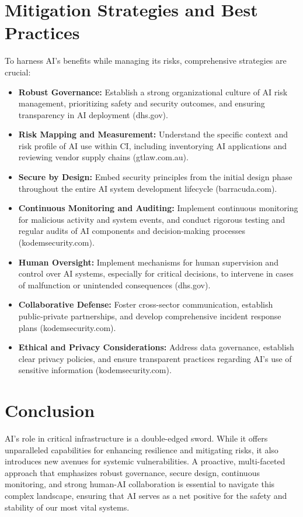 \section{Mitigation Strategies and Best Practices}
To harness AI's benefits while managing its risks, comprehensive strategies are crucial:
\begin{itemize}
    \item \textbf{Robust Governance:} Establish a strong organizational culture of AI risk management, prioritizing safety and security outcomes, and ensuring transparency in AI deployment (dhs.gov).
    \item \textbf{Risk Mapping and Measurement:} Understand the specific context and risk profile of AI use within CI, including inventorying AI applications and reviewing vendor supply chains (gtlaw.com.au).
    \item \textbf{Secure by Design:} Embed security principles from the initial design phase throughout the entire AI system development lifecycle (barracuda.com).
    \item \textbf{Continuous Monitoring and Auditing:} Implement continuous monitoring for malicious activity and system events, and conduct rigorous testing and regular audits of AI components and decision-making processes (kodemsecurity.com).
    \item \textbf{Human Oversight:} Implement mechanisms for human supervision and control over AI systems, especially for critical decisions, to intervene in cases of malfunction or unintended consequences (dhs.gov).
    \item \textbf{Collaborative Defense:} Foster cross-sector communication, establish public-private partnerships, and develop comprehensive incident response plans (kodemsecurity.com).
    \item \textbf{Ethical and Privacy Considerations:} Address data governance, establish clear privacy policies, and ensure transparent practices regarding AI's use of sensitive information (kodemsecurity.com).
\end{itemize}

\section{Conclusion}
AI's role in critical infrastructure is a double-edged sword. While it offers unparalleled capabilities for enhancing resilience and mitigating risks, it also introduces new avenues for systemic vulnerabilities. A proactive, multi-faceted approach that emphasizes robust governance, secure design, continuous monitoring, and strong human-AI collaboration is essential to navigate this complex landscape, ensuring that AI serves as a net positive for the safety and stability of our most vital systems.
